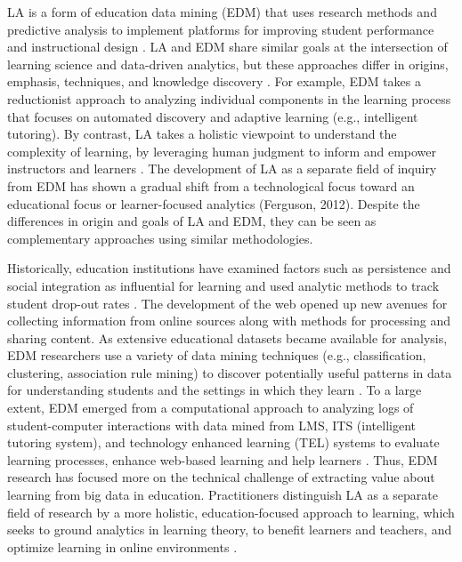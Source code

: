 \documentclass[sigconf]{acmart}
\begin{document}
LA is a form of education data mining (EDM) that uses research methods and 
predictive analysis to implement platforms for improving student performance and 
instructional design \cite{Baker09, Lester19}. LA and EDM share similar goals 
at the intersection of learning science and data-driven analytics, but these 
approaches differ in origins, emphasis, techniques, and knowledge discovery 
\cite{siemens12}. For example, EDM takes a reductionist approach to analyzing 
individual components in the learning process that focuses on automated discovery
and adaptive learning (e.g., intelligent tutoring). By contrast, LA takes a 
holistic viewpoint to understand the complexity of learning, by leveraging human 
judgment to inform and empower instructors and learners \cite{Papamitsiou14}. 
The development of LA as a separate field of inquiry from EDM has shown a gradual 
shift from a technological focus toward an educational focus or learner-focused 
analytics (Ferguson, 2012). Despite the differences in origin and goals of LA 
and EDM, they can be seen as complementary approaches using similar methodologies. 


Historically, education institutions have examined factors such as persistence 
and social integration as influential for learning and used analytic methods to 
track student drop-out rates \cite{ferguson12}. The development of the web opened 
up new avenues for collecting information from online sources along with methods 
for processing and sharing content. As extensive educational datasets became 
available for analysis, EDM researchers use a variety of data mining techniques 
(e.g., classification, clustering, association rule mining) to discover 
potentially useful patterns in data for understanding students and the settings 
in which they learn \cite{bakerYucef09}. To a large extent, EDM emerged from 
a computational approach to analyzing logs of student-computer interactions with
data mined from LMS, ITS (intelligent tutoring system), and technology enhanced 
learning (TEL) systems to evaluate learning processes, enhance web-based learning 
and help learners \cite{penaAyala14, romero10}. Thus, EDM research has focused 
more on the technical challenge of extracting value about learning from big data 
in education. Practitioners distinguish LA as a separate field of research by a 
more holistic, education-focused approach to learning, which seeks to ground 
analytics in learning theory, to benefit learners and teachers, and optimize 
learning in online environments \cite{lang17, papamitsiou14}. 
\end{document}
